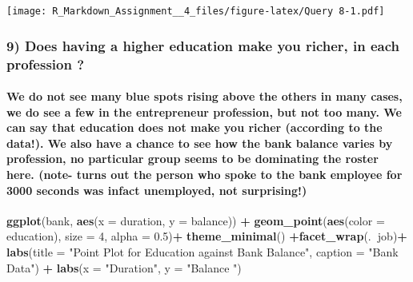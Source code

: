 \documentclass[]{article}
\newenvironment{Shaded}{\begin{snugshade}}{\end{snugshade}}
\newcommand{\KeywordTok}[1]{\textcolor[rgb]{0.13,0.29,0.53}{\textbf{#1}}}
\newcommand{\DataTypeTok}[1]{\textcolor[rgb]{0.13,0.29,0.53}{#1}}
\newcommand{\DecValTok}[1]{\textcolor[rgb]{0.00,0.00,0.81}{#1}}
\newcommand{\FloatTok}[1]{\textcolor[rgb]{0.00,0.00,0.81}{#1}}
\newcommand{\StringTok}[1]{\textcolor[rgb]{0.31,0.60,0.02}{#1}}
\newcommand{\OperatorTok}[1]{\textcolor[rgb]{0.81,0.36,0.00}{\textbf{#1}}}
\newcommand{\NormalTok}[1]{#1}
\let\oldparagraph\paragraph
\renewcommand{\paragraph}[1]{\oldparagraph{#1}\mbox{}}
\begin{document}
\texttt{[image: R\_Markdown\_Assignment\_\_4\_files/figure-latex/Query 8-1.pdf]}

\subsubsection{9) Does having a higher education make you richer, in
each profession
?}\label{does-having-a-higher-education-make-you-richer-in-each-profession}

\paragraph{We do not see many blue spots rising above the others in many
cases, we do see a few in the entrepreneur profession, but not too many.
We can say that education does not make you richer (according to the
data!). We also have a chance to see how the bank balance varies by
profession, no particular group seems to be dominating the roster here.
(note- turns out the person who spoke to the bank employee for 3000
seconds was infact unemployed, not
surprising!)}\label{we-do-not-see-many-blue-spots-rising-above-the-others-in-many-cases-we-do-see-a-few-in-the-entrepreneur-profession-but-not-too-many.-we-can-say-that-education-does-not-make-you-richer-according-to-the-data.-we-also-have-a-chance-to-see-how-the-bank-balance-varies-by-profession-no-particular-group-seems-to-be-dominating-the-roster-here.-note--turns-out-the-person-who-spoke-to-the-bank-employee-for-3000-seconds-was-infact-unemployed-not-surprising}

\begin{Shaded}
\begin{Highlighting}[]
 \KeywordTok{ggplot}\NormalTok{(bank, }\KeywordTok{aes}\NormalTok{(}\DataTypeTok{x =}\NormalTok{ duration, }\DataTypeTok{y =}\NormalTok{ balance)) }\OperatorTok{+}\StringTok{ }\KeywordTok{geom_point}\NormalTok{(}\KeywordTok{aes}\NormalTok{(}\DataTypeTok{color =}\NormalTok{ education), }\DataTypeTok{size =} \DecValTok{4}\NormalTok{, }\DataTypeTok{alpha =} \FloatTok{0.5}\NormalTok{)}\OperatorTok{+}\StringTok{ }\KeywordTok{theme_minimal}\NormalTok{() }\OperatorTok{+}\KeywordTok{facet_wrap}\NormalTok{(.}\OperatorTok{~}\NormalTok{job)}\OperatorTok{+}
\KeywordTok{labs}\NormalTok{(}\DataTypeTok{title =} \StringTok{"Point Plot for Education against Bank Balance"}\NormalTok{,}
\DataTypeTok{caption =} \StringTok{"Bank Data"}\NormalTok{) }\OperatorTok{+}
\KeywordTok{labs}\NormalTok{(}\DataTypeTok{x =} \StringTok{"Duration"}\NormalTok{, }\DataTypeTok{y =} \StringTok{"Balance "}\NormalTok{)}
\end{Highlighting}
\end{Shaded}
\end{document}
